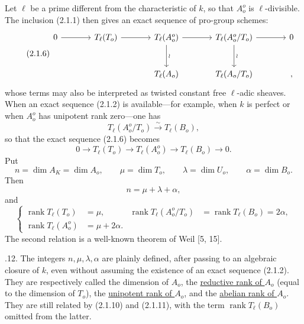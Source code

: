 Let $\ell$ be a prime different from the characteristic of $k$, so that
$A_o^o$ is $\ell$-divisible.  The inclusion (2.1.1) then gives an exact
sequence of pro-group schemes:
\begin{equation}\tag{2.1.6}
\begin{tikzcd}[row sep=large,column sep=large]
0 \arrow[r] & T_\ell(T_o) \arrow[r]
 & T_\ell(A_o^o) \arrow[r] \arrow[d,"\wr"]
 & T_\ell(A_o^o/T_o) \arrow[r] \arrow[d,"\wr"] & 0\\
 & & T_\ell(A_o) & T_\ell(A_o/T_o) & {,}
\end{tikzcd}
\end{equation}
whose terms may also be interpreted as twisted constant free
$\ell$-adic sheaves.  When an exact sequence (2.1.2) is available---for
example, when $k$ is perfect or when $A_o^o$ has unipotent rank
zero---one has
\begin{equation}\tag{2.1.7}
 T_\ell(A_o^o/T_o)\xrightarrow{\ \sim\ }T_\ell(B_o),
\end{equation}
so that the exact sequence (2.1.6) becomes
\begin{equation}\tag{2.1.8}
 0\longrightarrow T_\ell(T_o)\longrightarrow T_\ell(A_o^o)
 \longrightarrow T_\ell(B_o)\longrightarrow0.
\end{equation}
Put
\begin{equation}\tag{2.1.9}
 n=\dim A_K=\dim A_o,\qquad
 \mu=\dim T_o,\qquad
 \lambda=\dim U_o,\qquad
 \alpha=\dim B_o.
\end{equation}
Then
\begin{equation}\tag{2.1.10}
 n=\mu+\lambda+\alpha,
\end{equation}
and
\begin{equation}\tag{2.1.11}
 \left\{
 \begin{aligned}
 \operatorname{rank}T_\ell(T_o)&=\mu,&
 \operatorname{rank}T_\ell(A_o^o/T_o)
 &=\operatorname{rank}T_\ell(B_o)=2\alpha,\\
 \operatorname{rank}T_\ell(A_o^o)&=\mu+2\alpha.
 \end{aligned}
 \right.
\end{equation}
The second relation is a well-known theorem of Weil [5, 15].

\medskip
{}.12. The integers $n,\mu,\lambda,\alpha$ are plainly defined, after
passing to an algebraic closure of $k$, even without assuming the
existence of an exact sequence (2.1.2).  They are respectively called
the dimension of $A_o$, the \underline{reductive rank of $A_o$}
(equal to the dimension of $T_o$), the \underline{unipotent rank of
$A_o$}, and the \underline{abelian rank of $A_o$}.  They are still
related by (2.1.10) and (2.1.11), with the term
$\operatorname{rank}T_\ell(B_o)$ omitted from the latter.

